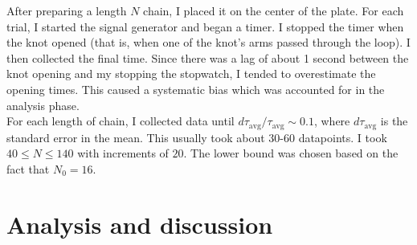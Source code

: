 \documentclass[11pt]{article}
\begin{document}
    After preparing a length $N$ chain, I placed it on the center of the plate. For each trial, 
    I started the signal generator and began a timer. I stopped the timer when the knot opened (that is, 
    when one of the knot's arms passed through the loop). I then collected the final 
    time. Since there was a lag of about 1 second between the knot opening and my stopping the
    stopwatch, I tended to overestimate the opening times. This caused a systematic bias which was
    accounted for in the analysis phase.\\

    For each length of chain, I collected data until $d\tau_{\text{avg}}/\tau_{\text{avg}} \sim 0.1$, 
    where $d\tau_{\text{avg}}$ is the standard error in the mean. This usually took about 30-60 datapoints. I took $40 \leq N \leq 140$ with increments of 
    $20$. The lower bound was chosen based on the fact that $N_0=16$.

\section{Analysis and discussion}
\end{document}
